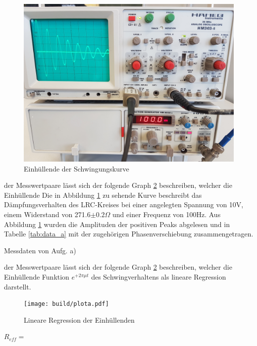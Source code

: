   \begin{figure}[H]
    \includegraphics[width=\textwidth]{images/5a.jpg}
    \centering
    \caption{Einhüllende der Schwingungskurve}
    \label{fig:5a}
  \end{figure}

  \justifying der Messwertpaare lässt sich der folgende Graph \ref{fig:5ajpg} beschreiben, welcher die Einhüllende 
  Die in Abbildung \ref{fig:5a} zu sehende Kurve beschreibt das Dämpfungsverhalten des LRC-Kreises bei einer angelegten Spannung von 
  10V, einem Widerstand von 271.6$\pm0.2\Omega$ und einer Frequenz von 100Hz. Aus Abbildung \ref{fig:5a} wurden die Amplituden der positiven Peaks
  abgelesen und in Tabelle \ref{tab:data_a} mit der zugehörigen Phasenverschiebung zusammengetragen.

  \begin{table}[H]
        \centering
        \caption{Messdaten von Aufg. a)}
         
        \label{tab:data_a}
  \end{table}

  \justifying der Messwertpaare lässt sich der folgende Graph \ref{fig:5ajpg} beschreiben, welcher die Einhüllende 
  Funktion $e^{+2\pi\mu t}$ des Schwingverhaltens als lineare Regression darstellt.

  \begin{figure}[H]
    \texttt{[image: build/plota.pdf]}
    \centering
    \caption{Lineare Regression der Einhüllenden}
    \label{fig:5ajpg}
  \end{figure}

  $R_{eff} =$

